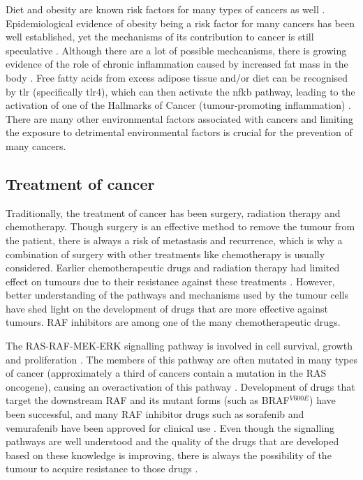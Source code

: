 Diet and obesity are known risk factors for many types of cancers as well \citep{Ames1995,Calle2004}.
Epidemiological evidence of obesity being a risk factor for many cancers has been well established, yet the mechanisms of its contribution to cancer is still  speculative \citep{Calle2003,Kelesidis2006}.
Although there are a lot of possible mechcanisms, there is growing evidence of the role of chronic inflammation caused by increased fat mass in the body \citep{Kelesidis2006,Lumeng2011,Hernandez2013}.
Free fatty acids from excess adipose tissue and/or diet can be recognised by \gls{tlr} (specifically \gls{tlr}4), which can then activate the \gls{nfkb} pathway, leading to the activation of one of the Hallmarks of Cancer (tumour-promoting inflammation) \citep{Lumeng2011}.
There are many other environmental factors associated with cancers and limiting the exposure to detrimental environmental factors is crucial for the prevention of many cancers.

\subsection{Treatment of cancer}
\label{sub:treatment_of_cancer}

Traditionally, the treatment of cancer has been surgery, radiation therapy and chemotherapy.
Though surgery is an effective method to remove the tumour from the patient, there is always a risk of metastasis and recurrence, which is why a combination of surgery with other treatments like chemotherapy is usually considered.
Earlier chemotherapeutic drugs and radiation therapy had limited effect on tumours due to their resistance against these treatments \citep{Wilhelm2006}.
However, better understanding of the pathways and mechanisms used by the tumour cells have shed  light on the development of drugs that are more effective against tumours.
RAF inhibitors are among one of the many chemotherapeutic drugs.

The RAS-RAF-MEK-ERK signalling pathway is  involved in cell survival, growth and proliferation \citep{Samatar2014,Wilhelm2006}.
The members of this pathway are often mutated in many types of cancer (approximately a third of cancers contain a mutation in the RAS oncogene), causing an overactivation of this pathway \citep{Samatar2014}.
Development of drugs that target  the downstream RAF and its mutant forms (such as BRAF$^{V600E}$) have been successful, and many RAF inhibitor drugs such as sorafenib and vemurafenib have been approved for clinical use \citep{Samatar2014,Wilhelm2006}.
Even though the signalling pathways are well understood and the quality of the drugs that are developed based on these knowledge is improving, there is always the possibility of the tumour to acquire resistance to those drugs \citep{Samatar2014}.

